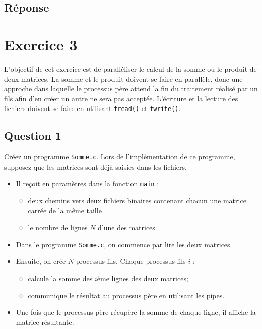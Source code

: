 \documentclass[
	12pt, %
]{fphw}
\begin{document}
\subsection*{Réponse}


\section*{Exercice 3}
L'objectif de cet exercice est de paralléliser le calcul de la somme ou le produit de deux matrices.
La somme et le produit doivent se faire en parallèle, donc une approche dans laquelle le processus père attend la fin du traitement réalisé par un fils afin d'en créer un autre ne sera pas acceptée.
L'écriture et la lecture des fichiers doivent se faire en utilisant \texttt{fread()} et \texttt{fwrite()}.
\subsection*{Question 1}
\begin{problem}
Créez un programme \texttt{Somme.c}. Lors de l'implémentation de ce programme, supposez que les matrices sont déjà saisies dans les fichiers.
\begin{itemize}
	\item Il reçoit en paramètres dans la fonction \texttt{main} :
	\begin{itemize}
		\item deux chemins vers deux fichiers binaires contenant chacun une matrice carrée de la même taille 
		\item le nombre de lignes $N$ d'une des matrices. 
	\end{itemize}
	\item Dans le programme \texttt{Somme.c}, on commence par lire les deux matrices. 
	\item Ensuite, on crée $N$ processus fils. Chaque processus fils $i$ :
	\begin{itemize}
		\item calcule la somme des $i$ème lignes des deux matrices;
		\item communique le résultat au processus père en utilisant les pipes. 
	\end{itemize} 
	\item Une fois que le processus père récupère la somme de chaque ligne, il affiche la matrice résultante.
\end{itemize}
\end{problem}
\end{document}
